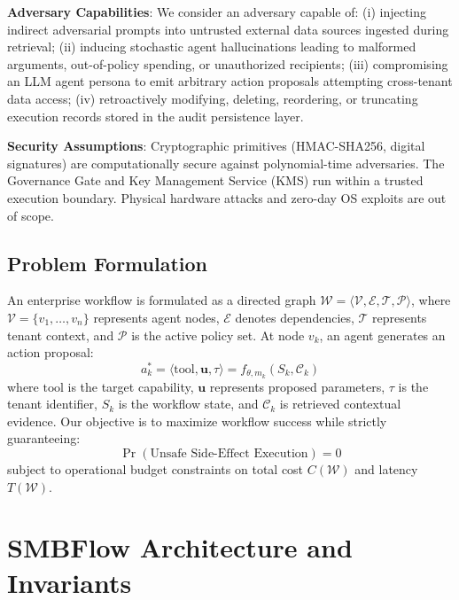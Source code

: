 \documentclass[conference]{IEEEtran}
\begin{document}
\textbf{Adversary Capabilities}: We consider an adversary capable of: (i) injecting indirect adversarial prompts into untrusted external data sources ingested during retrieval; (ii) inducing stochastic agent hallucinations leading to malformed arguments, out-of-policy spending, or unauthorized recipients; (iii) compromising an LLM agent persona to emit arbitrary action proposals attempting cross-tenant data access; (iv) retroactively modifying, deleting, reordering, or truncating execution records stored in the audit persistence layer.

\textbf{Security Assumptions}: Cryptographic primitives (HMAC-SHA256, digital signatures) are computationally secure against polynomial-time adversaries. The Governance Gate and Key Management Service (KMS) run within a trusted execution boundary. Physical hardware attacks and zero-day OS exploits are out of scope.

\subsection{Problem Formulation}
An enterprise workflow is formulated as a directed graph $\mathcal{W} = \langle \mathcal{V}, \mathcal{E}, \mathcal{T}, \mathcal{P} \rangle$, where $\mathcal{V} = \{v_1, \dots, v_n\}$ represents agent nodes, $\mathcal{E}$ denotes dependencies, $\mathcal{T}$ represents tenant context, and $\mathcal{P}$ is the active policy set. At node $v_k$, an agent generates an action proposal:
\begin{equation}
a_k^* = \langle \text{tool}, \mathbf{u}, \tau \rangle = f_{\theta, m_k}(S_k, \mathcal{C}_k)
\end{equation}
where $\text{tool}$ is the target capability, $\mathbf{u}$ represents proposed parameters, $\tau$ is the tenant identifier, $S_k$ is the workflow state, and $\mathcal{C}_k$ is retrieved contextual evidence. Our objective is to maximize workflow success while strictly guaranteeing:
\begin{equation}
\Pr(\text{Unsafe Side-Effect Execution}) = 0
\end{equation}
subject to operational budget constraints on total cost $C(\mathcal{W})$ and latency $T(\mathcal{W})$.

\section{SMBFlow Architecture and Invariants}
\end{document}
